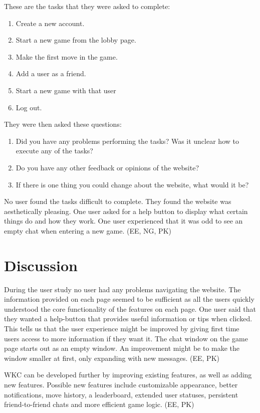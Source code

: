 \documentclass[acmlarge, review=false, screen=true]{acmart}
\begin{document}
    These are the tasks that they were asked to complete:
    \begin{enumerate}
      \item Create a new account.
      \item Start a new game from the lobby page.
      \item Make the first move in the game.
      \item Add a user as a friend.
      \item Start a new game with that user 
      \item Log out.
    \end{enumerate}

    They were then asked these questions:
    \begin{enumerate}
      \item Did you have any problems performing the tasks? Was it unclear how to execute any of the tasks?
      \item Do you have any other feedback or opinions of the website?
      \item If there is one thing you could change about the website, what would it be?
    \end{enumerate}

    No user found the tasks difficult to complete. They found the website was aesthetically pleasing. One user asked for a help button to display what certain things do and how they work. One user experienced that it was odd to see an empty chat when entering a new game. (EE, NG, PK)



\section{Discussion}
  During the user study no user had any problems navigating the website. The information provided on each page seemed to be sufficient as all the users quickly understood the core functionality of the features on each page. One user said that they wanted a help-button that provides useful information or tips when clicked. This tells us that the user experience might be improved by giving first time users access to more information if they want it. The chat window on the game page starts out as an empty window. An improvement might be to make the window smaller at first, only expanding with new messages. (EE, PK)

  WKC can be developed further by improving existing features, as well as adding new features. Possible new features include customizable appearance, better notifications, move history, a leaderboard, extended user statuses, persistent friend-to-friend chats and more efficient game logic. (EE, PK)
\end{document}

